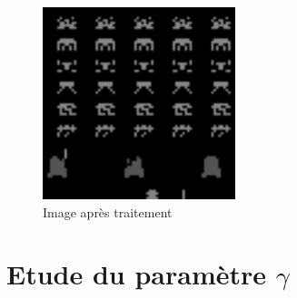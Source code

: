 \documentclass[12pt,oneside,a4paper]{article}
\begin{document}
    \begin{figure}[h]
        \centering
        \includegraphics[width=0.5\textwidth] {./processed_image.png}
        \caption{Image après traitement}
    \end{figure}


    \section{Etude du paramètre $\gamma$}
    \newpage
\end{document}
